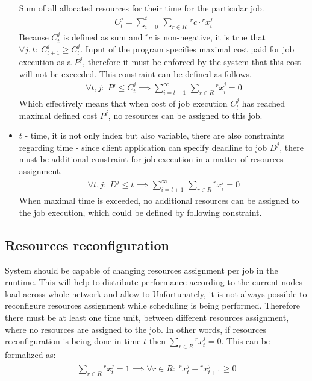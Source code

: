 \begin{itemize}
	      Sum of all allocated resources for their time for the particular job.
	      \begin{align*}
	      	C_{t}^{j} = \sum_{i = 0}^{t}\:\sum_{r \in R}\: {}^{r}c \cdot {}^{r}x_{t}^{j} 
	      \end{align*}
	      Because $C_{t}^{j}$ is defined as sum and ${}^{r}c$ is non-negative,
	      it is true that $\forall j, t:\; C_{t+1}^{j} \geq C_{t}^{j}$.
	      Input of the program specifies maximal cost paid for job execution as a $P^j$, 
	      therefore it must be enforced by the system that this cost will not be exceeded.
	      This constraint can be defined as follows.
	      \begin{align*}
	      	\forall t, j:\; P^{j} \leq C_{t}^{j} \implies \sum_{i = t+1}^{\infty} \, \sum_{r \in R} {}^{r}x_{i}^{j} = 0 
	      \end{align*}
	      Which effectively means that when cost of job execution $C_{t}^{j}$ has reached maximal defined cost $P^{j}$,
	      no resources can be assigned to this job.
	\item $t$ - time, it is not only index but also variable, there are also constraints regarding time -
	      since client application can specify deadline to job $D^{j}$,
	      there must be additional constraint for job execution in a matter of resources assignment.
	      \begin{align*}
	      	\forall t, j:\; D^{j} \leq t \implies \sum_{i = t+1}^{\infty} \, \sum_{r \in R} {}^{r}x_{i}^{j} = 0 
	      \end{align*}
	      When maximal time is exceeded, no additional resources can be assigned to the job execution, 
	      which could be defined by following constraint.
\end{itemize}

\subsection{Resources reconfiguration}\label{subsec:resource-config}
System should be capable of changing resources assignment per job in the runtime.
This will help to distribute performance according to the current nodes load across whole network
and allow to 
Unfortunately, it is not always possible to reconfigure resources assignment while scheduling is being performed.
Therefore there must be at least one time unit, between different resources assignment,
where no resources are assigned to the job.
In other words, if resources reconfiguration is being done in time $t$ then $\sum_{r \in R} {}^{r}x_{t}^{j} = 0$.
This can be formalized as:
\begin{align*}
	\sum_{r \in R} {}^{r}x_{t}^{j} = 1 \implies \forall r \in R:\; {}^{r}x_{t}^{j} - {}^{r}x_{t + 1}^{j} \geq 0
\end{align*}

